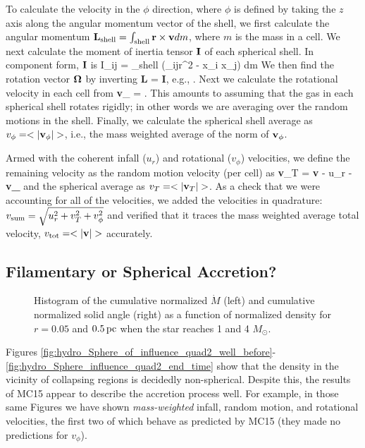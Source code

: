 \documentclass[../dissertation.tex]{subfiles}
\begin{document}
To calculate the velocity in the $\phi$ direction, where $\phi$ is defined by taking the $z$ axis along the angular momentum vector of the shell, we first calculate the angular momentum ${\bf L}_{\rm shell} = \int_{\rm shell} {\bf r} \times {\bf v} dm$, where $m$ is the mass in a cell. We next calculate the moment of inertia tensor ${\bf I}$ of each spherical shell.  In component form, ${\bf I}$ is
\be
I_{ij} = \int_{\rm shell} (\delta_{ij}r^2 - x_i x_j) dm
\label{eq:hydro_moment of inertia}
\ee
%
We then find the rotation vector ${\bf \Omega}$ by inverting
%
\be
{\bf L} = {\bf I}{\bf \Omega},
\ee
%
e.g., \citep{1992ApJ...399..551M}.
Next we calculate the rotational velocity in each cell from 
%
\be
{\bf v}_{\phi} = {\bf \Omega} .
\label{eq:hydro_calc v_phi}
\ee
%
This amounts to assuming that the gas in each spherical shell rotates rigidly; in other words we are averaging over the random motions in the shell. 
Finally, we calculate the spherical shell average as $v_{\phi} = <|{\bf v}_{\phi}|>$, i.e., the mass weighted average of the norm of ${\bf v}_{\phi}$.  

Armed with the coherent infall ($u_r$) and rotational ($v_{\phi}$) velocities, we define the remaining velocity as the random motion velocity (per cell) as 
\be
{\bf v}_T = {\bf v} - u_r - {\bf v_{\phi}}
\ee
and the spherical average as $v_T = <|{\bf v}_T|>$. 
As a check that we were accounting for all of the velocities, we added the velocities in quadrature: $v_{\rm sum} = \sqrt{u_r^2 + v_T^2 + v_{\phi}^2}$ and verified that it traces the mass weighted average total velocity, $v_{\rm tot} = <|{\bf v}|>$ accurately.



\subsection{Filamentary or Spherical Accretion?}
\begin{figure*}[htb]%
\caption[Hydro Normalized $\dot{M}$ and Normalized Solid Angle]{Histogram of the cumulative normalized $\dot{M}$ (left) and cumulative normalized solid angle (right) as a function of normalized density for $r=0.05$ and $0.5\,\rm pc$ when the star reaches 1 and 4 $M_{\odot}$. \label{fig:hydro_Accretion_avg}}
\end{figure*}

Figures 
\ref{fig:hydro_Sphere_of_influence_quad2_well_before}-\ref{fig:hydro_Sphere_influence_quad2_end_time} 
show that the density in the vicinity of collapsing regions
is decidedly non-spherical. Despite this, the results of MC15 appear to describe the 
accretion process well. For example, in those same Figures we have shown {\em mass-weighted} 
infall, random motion, and rotational velocities, the first two of which behave as predicted by
MC15 (they made no predictions for $v_\phi$). 
\end{document}
